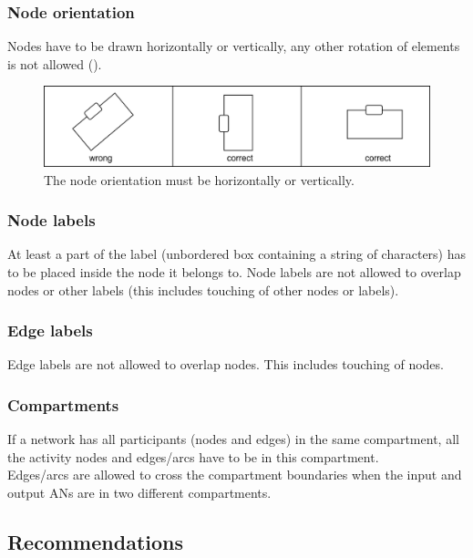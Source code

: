 \subsubsection{Node orientation}

Nodes have to be drawn horizontally or vertically, any other rotation of elements is not allowed ().

\begin{figure}[h!]
  \centering
  \includegraphics[scale=0.4]{images/layout-orientation}
  \caption{The node orientation must be horizontally or vertically.}\label{fig:af:layout5}
\end{figure}

\subsubsection{Node labels}

At least a part of the label (unbordered box containing a string of characters) has to be placed inside the node it belongs to. Node labels are not allowed to overlap nodes or other labels (this includes touching of other nodes or labels).

\subsubsection{Edge labels}

Edge labels are not allowed to overlap nodes. This includes touching of nodes.

\subsubsection{Compartments}

If a network has all participants (nodes and edges) in the same compartment, all the activity nodes and edges/arcs have to be in this compartment.  \\
Edges/arcs are allowed to cross the compartment boundaries when the input and output ANs are in two different compartments.

\subsection{Recommendations}

